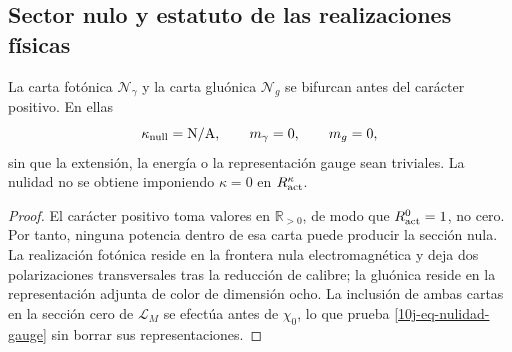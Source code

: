 \subsection{Sector nulo y estatuto de las realizaciones físicas}

\begin{theorem}
\label{10j-thm-sector-nulo}
La carta fotónica \(\mathcal N_\gamma\) y la carta gluónica
\(\mathcal N_g\) se bifurcan antes del carácter positivo. En ellas
\begin{equation}
 \kappa_{\rm null}=\mathrm{N/A},
 \qquad m_\gamma=0,
 \qquad m_g=0,
 \label{10j-eq-nulidad-gauge}
\end{equation}
sin que la extensión, la energía o la representación gauge sean triviales.
La nulidad no se obtiene imponiendo \(\kappa=0\) en
\(R_{\rm act}^\kappa\).
\end{theorem}

\begin{proof}
El carácter positivo toma valores en \(\mathbb R_{>0}\), de modo que
\(R_{\rm act}^0=1\), no cero. Por tanto, ninguna potencia dentro de esa
carta puede producir la sección nula. La realización fotónica reside en la
frontera nula electromagnética y deja dos polarizaciones transversales tras
la reducción de calibre; la gluónica reside en la representación adjunta de
color de dimensión ocho. La inclusión de ambas cartas en la sección cero de
\(\mathcal L_M\) se efectúa antes de \(\chi_0\), lo que prueba
\eqref{10j-eq-nulidad-gauge} sin borrar sus representaciones.
\end{proof}

